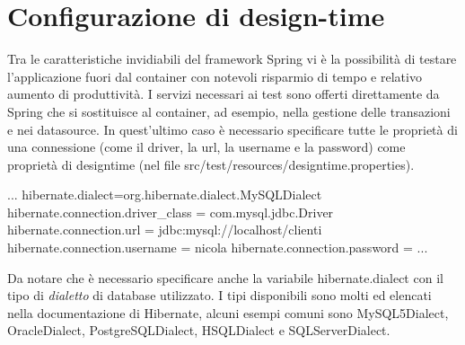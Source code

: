 \section{Configurazione di design-time}
Tra le caratteristiche invidiabili del framework Spring vi è la possibilità di testare l'applicazione fuori dal container con notevoli risparmio di tempo e relativo aumento di produttività. I servizi necessari ai test sono offerti direttamente da Spring che si sostituisce al container, ad esempio, nella gestione delle transazioni e nei datasource. In quest'ultimo caso è necessario specificare tutte le proprietà di una connessione (come il driver, la url, la username e la password) come proprietà di designtime (nel file src/test/resources/designtime.properties).

\begin{bash}
...
hibernate.dialect=org.hibernate.dialect.MySQLDialect
hibernate.connection.driver_class = com.mysql.jdbc.Driver
hibernate.connection.url = jdbc:mysql://localhost/clienti
hibernate.connection.username = nicola
hibernate.connection.password = 
...
\end{bash}

Da notare che è necessario specificare anche la variabile hibernate.dialect con il tipo di \emph{dialetto} di database utilizzato. I tipi disponibili sono molti ed elencati nella documentazione di Hibernate, alcuni esempi comuni sono MySQL5Dialect, OracleDialect, PostgreSQLDialect, HSQLDialect e SQLServerDialect.



